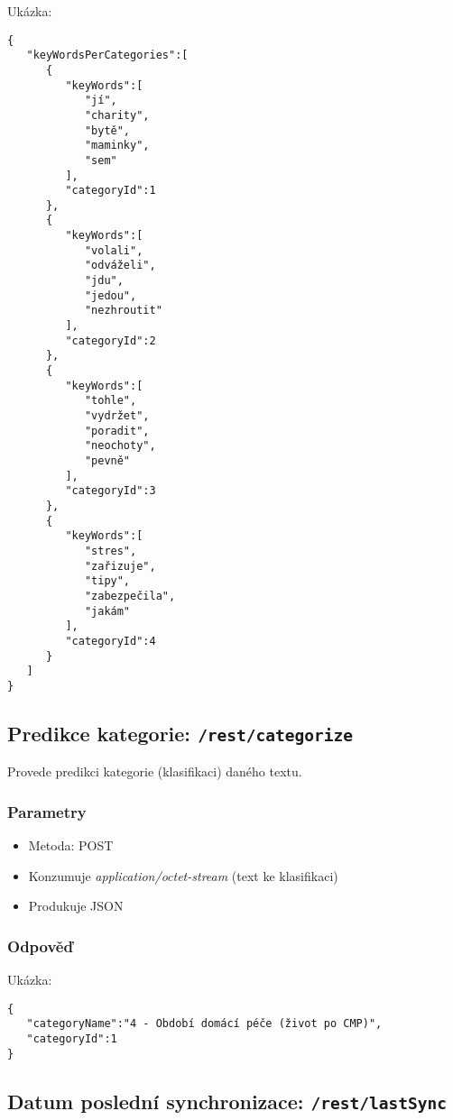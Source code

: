 \documentclass{article}
\begin{document}
Ukázka:

\begin{verbatim}
{
   "keyWordsPerCategories":[
      {
         "keyWords":[
            "jí",
            "charity",
            "bytě",
            "maminky",
            "sem"
         ],
         "categoryId":1
      },
      {
         "keyWords":[
            "volali",
            "odváželi",
            "jdu",
            "jedou",
            "nezhroutit"
         ],
         "categoryId":2
      },
      {
         "keyWords":[
            "tohle",
            "vydržet",
            "poradit",
            "neochoty",
            "pevně"
         ],
         "categoryId":3
      },
      {
         "keyWords":[
            "stres",
            "zařizuje",
            "tipy",
            "zabezpečila",
            "jakám"
         ],
         "categoryId":4
      }
   ]
}
\end{verbatim}

\subsection{Predikce kategorie: \texttt{/rest/categorize}}

Provede predikci kategorie (klasifikaci) daného textu.

\subsubsection{Parametry}

\begin{itemize}
	\item Metoda: POST
	\item Konzumuje \textit{application/octet-stream} (text ke klasifikaci)
	\item Produkuje JSON
\end{itemize}

\subsubsection{Odpověď}

Ukázka:

\begin{verbatim}
{
   "categoryName":"4 - Období domácí péče (život po CMP)",
   "categoryId":1
}
\end{verbatim}

\subsection{Datum poslední synchronizace: \texttt{/rest/lastSync}}
\end{document}
